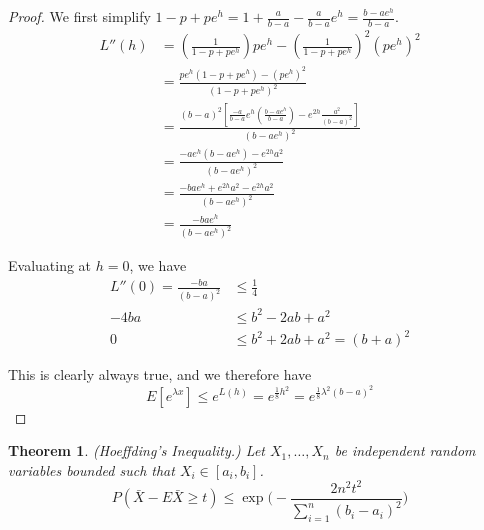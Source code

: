 \documentclass{article}
\newtheorem{thm}{Theorem}
\begin{document}
\begin{proof}
We first simplify $1 - p + pe^h = 1 + \frac{a}{b-a} - \frac{a}{b-a}e^h = \frac{b-ae^h}{b-a}$.
\begin{align*}
    L''(h) &= (\frac{1}{1-p+pe^h})p e^h - (\frac{1}{1-p+pe^h})^2 (pe^h)^2\\
            &= \frac{pe^h(1-p+pe^h)-(pe^h)^2}{(1-p+pe^h)^2}\\
            &= \frac{(b-a)^2 [\frac{-a}{b-a}e^h(\frac{b-ae^h}{b-a})-e^{2h}\frac{a^2}{(b-a)^2}]}{(b-ae^h)^2}\\
            &= \frac{-a e^h (b-ae^h) - e^{2h} a^2}{(b-ae^h)^2}\\
            &= \frac{-bae^h + e^{2h}a^2 - e^{2h}a^2}{(b-ae^h)^2}\\
            &= \frac{-bae^h}{(b-ae^h)^2}
\end{align*}

Evaluating at $h = 0$, we have
\begin{align*}
    L''(0) = \frac{-ba}{(b-a)^2} &\leq \frac{1}{4}\\
            -4ba &\leq b^2 -2ab + a^2\\
            0 &\leq b^2 + 2ab + a^2 = (b+a)^2
\end{align*}

This is clearly always true, and we therefore have
$$E[e^{\lambda x}] \leq e^{L(h)} = e^{\frac{1}{8} h^2} = e^{\frac{1}{8} \lambda^2 (b-a)^2}$$
\end{proof}

\begin{framed}
\begin{thm} (Hoeffding's Inequality.) Let $X_1, \dots, X_n$ be independent
random variables bounded such that $X_i \in [a_i, b_i]$.
$$P(\bar{X} - E\bar{X} \geq t) \leq \exp\bigg(-\frac{2n^2t^2}{\sum_{i=1}^n (b_i-a_i)^2}\bigg)$$
\end{thm}
\end{framed}
\end{document}
